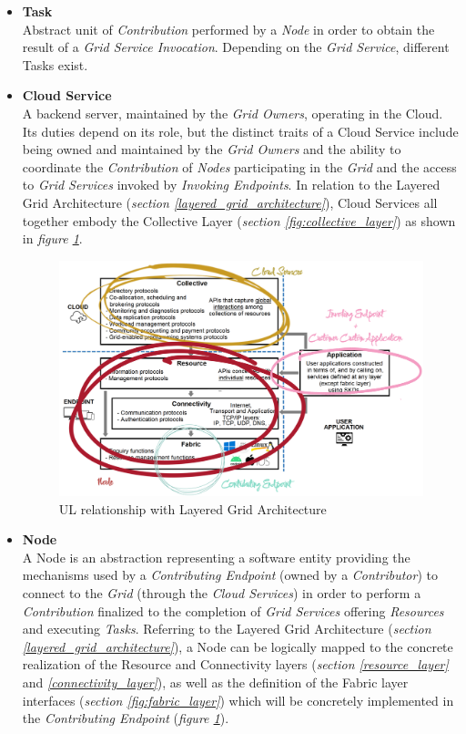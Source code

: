 \begin{itemize}
    \item \textbf{Task}\label{task}\\
    Abstract unit of \textit{Contribution} performed by a \textit{Node} in order to obtain the result of a \textit{Grid Service Invocation}. Depending on the \textit{Grid Service}, different Tasks exist.
    \item \textbf{Cloud Service}\label{cloud_service}\\
    A backend server, maintained by the \textit{Grid Owners}, operating in the Cloud. Its duties depend on its role, but the distinct traits of a Cloud Service include being owned and maintained by the \textit{Grid Owners} and the ability to coordinate the \textit{Contribution} of \textit{Nodes} participating in the \textit{Grid} and the access to \textit{Grid Services} invoked by \textit{Invoking Endpoints}. In relation to the Layered Grid Architecture (\textit{section \ref{layered_grid_architecture}}), Cloud Services all together embody the Collective Layer (\textit{section \ref{fig:collective_layer}}) as shown in \textit{figure \ref{fig:layered_grid_architecture_and_ul}}.
    \begin{figure}[!ht]
        \centering
        \includegraphics[width=\linewidth]{document/chapters/chapter_5/images/layered_grid_architecture_and_ul.png}
        \caption{UL relationship with Layered Grid Architecture}
        \label{fig:layered_grid_architecture_and_ul}
    \end{figure}
    \item \textbf{Node}\label{node}\\
    A Node is an abstraction representing a software entity providing the mechanisms used by a \textit{Contributing Endpoint} (owned by a \textit{Contributor}) to connect to the \textit{Grid} (through the \textit{Cloud Services}) in order to perform a \textit{Contribution} finalized to the completion of \textit{Grid Services} offering \textit{Resources} and executing \textit{Tasks}. Referring to the Layered Grid Architecture (\textit{section \ref{layered_grid_architecture}}), a Node can be logically mapped to the concrete realization of the Resource and Connectivity layers (\textit{section \ref{resource_layer}} and \textit{\ref{connectivity_layer}}), as well as the definition of the Fabric layer interfaces (\textit{section \ref{fig:fabric_layer}}) which will be concretely implemented in the \textit{Contributing Endpoint} (\textit{figure \ref{fig:layered_grid_architecture_and_ul}}).

\end{itemize}
